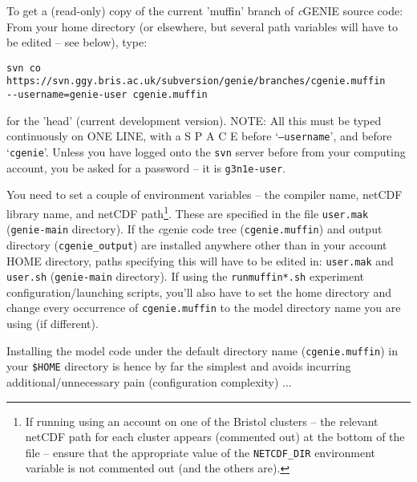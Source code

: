 \documentclass[10pt,twoside]{article}
\begin{document}
\begin{compactenum}
\item   To get a (read-only) copy of the current 'muffin' branch of \textit{c}GENIE source code:
\\ From your home directory (or elsewhere, but several path variables will have to be edited -- see below), type:
\vspace{-5pt}\begin{verbatim}
svn co https://svn.ggy.bris.ac.uk/subversion/genie/branches/cgenie.muffin
--username=genie-user cgenie.muffin
\end{verbatim}\vspace{-5pt}
for the 'head' (current development version).
NOTE: All this must be typed continuously on ONE LINE, with a S P A C E before `\texttt{--username}', and before `\texttt{cgenie}'.
Unless you have logged onto the \texttt{svn} server before from your computing account, you be asked for a password -- it is \texttt{g3n1e-user}.

\item   You need to set a couple of environment variables -- the compiler name, netCDF library name, and netCDF path\footnote{If running using an account on one of the Bristol clusters -- the relevant netCDF path for each cluster appears (commented out) at the bottom of the file -- ensure that the appropriate value of the \texttt{NETCDF\_DIR} environment variable is not commented out (and the others are).}. These are specified in the file \texttt{user.mak} (\texttt{genie-main} directory). If the \textit{c}genie code tree (\texttt{cgenie.muffin}) and output directory (\texttt{cgenie\_output}) are installed anywhere other than in your account HOME directory, paths specifying this will have to be edited in: \texttt{user.mak} and \texttt{user.sh} (\texttt{genie-main} directory). If using the \texttt{runmuffin*.sh} experiment configuration/launching scripts, you'll also have to set the home directory  and change every occurrence of \texttt{cgenie.muffin} to the model directory name you are using (if different).

Installing the model code under the default directory name (\texttt{cgenie.muffin}) in your \texttt{\$HOME} directory is hence by far the simplest and avoids incurring additional/unnecessary pain (configuration complexity) ...


\end{compactenum}
\end{document}
